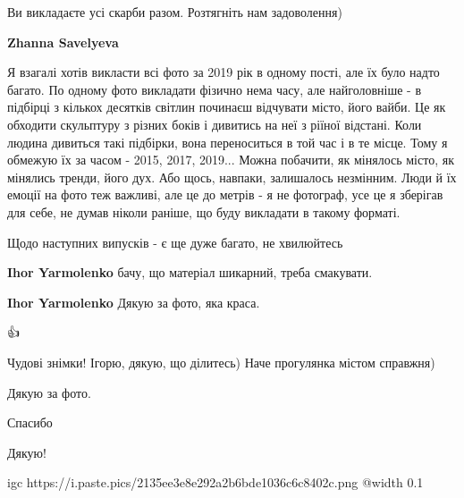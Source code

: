  
 
 
 
 

\qqSecCmt


Ви викладаєте усі скарби разом. Розтягніть нам задоволення)

\begin{itemize} %
\textbf{Zhanna Savelyeva} 

Я взагалі хотів викласти всі фото за 2019 рік в одному пості, але їх було надто
багато. По одному фото викладати фізично нема часу, але найголовніше - в
підбірці з кількох десятків світлин починаєш відчувати місто, його вайби. Це як
обходити скульптуру з різних боків і дивитись на неї з ріїної відстані. Коли
людина дивиться такі підбірки, вона переноситься в той час і в те місце. Тому я
обмежую їх за часом - 2015, 2017, 2019... Можна побачити, як мінялось місто, як
мінялись тренди, його дух. Або щось, навпаки, залишалось незмінним. Люди й їх
емоції на фото теж важливі, але це до метрів - я не фотограф, усе це я зберігав
для себе, не думав ніколи раніше, що буду викладати в такому форматі.

Щодо наступних випусків - є ще дуже багато, не хвилюйтесь 🙂

\textbf{Ihor Yarmolenko} бачу, що матеріал шикарний, треба смакувати.

\textbf{Ihor Yarmolenko} Дякую за фото, яка краса.
\end{itemize} %


👍


Чудові знімки! Ігорю, дякую, що ділитесь) Наче прогулянка містом справжня)


Дякую за фото.


Спасибо


Дякую!


\ifcmt
  igc https://i.paste.pics/2135ee3e8e292a2b6bde1036c6c8402c.png
	@width 0.1
\fi
